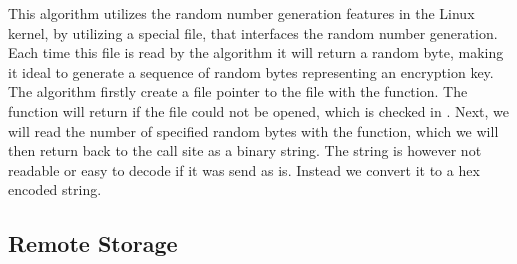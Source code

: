 This algorithm utilizes the random number generation features in the Linux kernel, by utilizing a special file,  that interfaces the random number generation. Each time this file is read by the algorithm it will return a random byte, making it ideal to generate a sequence of random bytes representing an encryption key. The algorithm firstly create a file pointer to the  file with the  function. The function will return  if the file could not be opened, which is checked in . Next, we will read the number of specified random bytes with the  function, which we will then return back to the call site as a binary string. The string is however not readable or easy to decode if it was send as is. Instead we convert it to a hex encoded string. 


\subsection{Remote Storage}
\label{sub:remote_storage}

